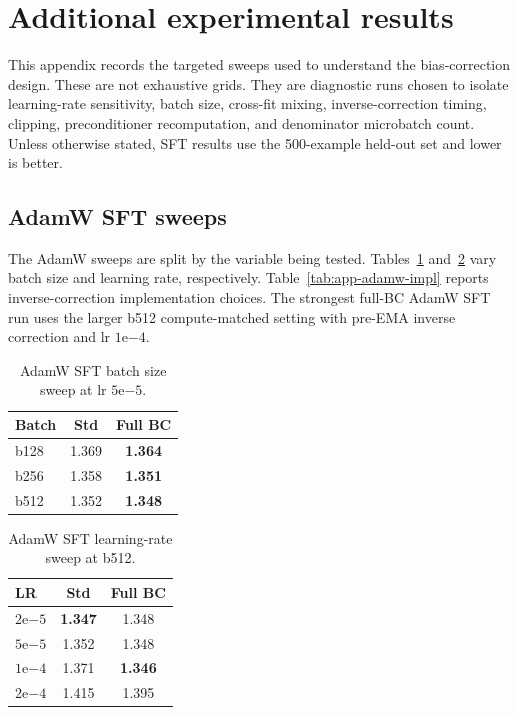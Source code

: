 \documentclass{article}
\newcommand{\best}[1]{\textbf{#1}}
\begin{document}
\section{Additional experimental results}
\label{app:additional-experiments}

This appendix records the targeted sweeps used to understand the bias-correction design. These are not exhaustive grids. They are diagnostic runs chosen to isolate learning-rate sensitivity, batch size, cross-fit mixing, inverse-correction timing, clipping, preconditioner recomputation, and denominator microbatch count. Unless otherwise stated, SFT results use the 500-example held-out set and lower is better.

\subsection{AdamW SFT sweeps}

The AdamW sweeps are split by the variable being tested. Tables~\ref{tab:app-adamw-controls} and~\ref{tab:app-adamw-full-lr} vary batch size and learning rate, respectively. Table~\ref{tab:app-adamw-impl} reports inverse-correction implementation choices. The strongest full-BC AdamW SFT run uses the larger b512 compute-matched setting with pre-EMA inverse correction and lr $1\mathrm{e}{-4}$.

\begin{table}[t]
\centering
\small
\setlength{\tabcolsep}{4pt}
\renewcommand{\arraystretch}{1.1}
\caption{AdamW SFT batch size sweep at lr $5\mathrm{e}{-5}$.}
\label{tab:app-adamw-controls}
\begin{tabular}{@{}lcc@{}}
\toprule
\rowcolor{headergray}
\textbf{Batch} & \textbf{Std} & \textbf{Full BC} \\
\midrule
b128 & 1.369 & \best{1.364} \\
b256 & 1.358 & \best{1.351} \\
b512 & 1.352 & \best{1.348} \\
\bottomrule
\end{tabular}
\end{table}

\begin{table}[t]
\centering
\small
\setlength{\tabcolsep}{4pt}
\renewcommand{\arraystretch}{1.1}
\caption{AdamW SFT learning-rate sweep at b512.}
\label{tab:app-adamw-full-lr}
\begin{tabular}{@{}lcc@{}}
\toprule
\rowcolor{headergray}
\textbf{LR} & \textbf{Std} & \textbf{Full BC} \\
\midrule
$2\mathrm{e}{-5}$ & \best{1.347} & 1.348 \\
$5\mathrm{e}{-5}$ & 1.352 & 1.348 \\
$1\mathrm{e}{-4}$ & 1.371 & \best{1.346} \\
$2\mathrm{e}{-4}$ & 1.415 & 1.395 \\
\bottomrule
\end{tabular}
\end{table}
\end{document}
